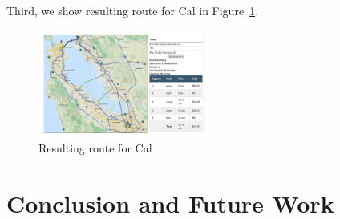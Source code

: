\documentclass[letterpaper]{article}
\newcommand{\figref}[1]{Figure~\ref{fig:#1}}
\begin{document}
Third, we show resulting route for Cal in \figref{cal}.
\begin{figure}[!ht]
  \centering
    \includegraphics[width=0.5\textwidth]{figs/result_Cal.pdf}
  \caption{Resulting route for Cal\label{fig:cal}}
\end{figure}



\section{Conclusion and Future Work}




\end{document}
